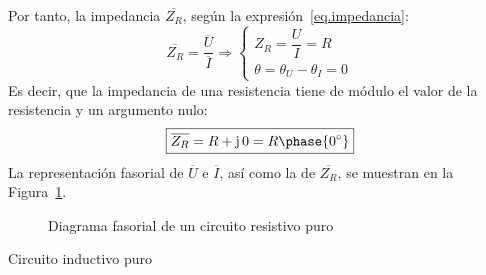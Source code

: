 \documentclass[11pt]{book} %
\makeatletter
\numberwithin{dummy}{section}
\theoremstyle{ocrenumbox}
\theoremstyle{blacknumex}
\theoremstyle{blacknumbox}
\theoremstyle{ocrenum}
\renewcommand{\subsection}{\@startsection {subsection}{2}{\z@}
{-3ex \@plus -0.1ex \@minus -.4ex}
{0.5ex \@plus.2ex }
{\normalfont\sffamily\bfseries}}
\makeatother
\begin{document}
	Por tanto, la impedancia $\overline{Z_R}$, según la expresión~\eqref{eq.impedancia}:
	\begin{equation*}
		\overline{Z_R}=\dfrac{\overline{U}}{\overline{I}}\Rightarrow
		\begin{cases}
			Z_R=\dfrac{U}{I}=R\\
			\theta=\theta_U-\theta_I=0
		\end{cases}
	\end{equation*}
	Es decir, que la impedancia de una resistencia tiene de módulo el valor de la resistencia y un argumento nulo: 
	\begin{equation}\label{eq.resistencia}
		\boxed{ \overline{Z_R}=R+\mathrm{j}\,0=R\phase{0^\circ}}
	\end{equation}
	La representación fasorial de $\overline{U}$ e $\overline{I}$, así como la de $\overline{Z_R}$, se muestran en la Figura~\ref{fig.fasorResistencia}. 
	\begin{figure}[htbp]
		\centering
		\hfil
		\caption{Diagrama fasorial de un circuito resistivo puro}
		\label{fig.fasorResistencia}
	\end{figure}
	
	\subsection{Circuito inductivo puro}\label{sec.L-puro}
	
\end{document}
